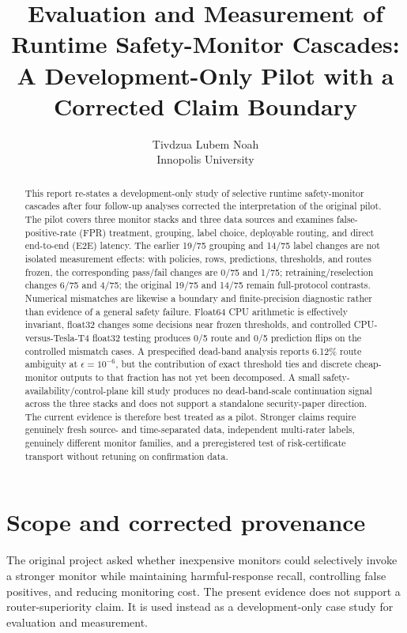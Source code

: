 \documentclass[11pt]{article}
\title{Evaluation and Measurement of Runtime Safety-Monitor Cascades:\\
A Development-Only Pilot with a Corrected Claim Boundary}
\author{Tivdzua Lubem Noah\\Innopolis University}
\date{}
\begin{document}
\maketitle

\begin{abstract}
This report re-states a development-only study of selective runtime safety-monitor cascades after four follow-up analyses corrected the interpretation of the original pilot. The pilot covers three monitor stacks and three data sources and examines false-positive-rate (FPR) treatment, grouping, label choice, deployable routing, and direct end-to-end (E2E) latency. The earlier 19/75 grouping and 14/75 label changes are not isolated measurement effects: with policies, rows, predictions, thresholds, and routes frozen, the corresponding pass/fail changes are 0/75 and 1/75; retraining/reselection changes 6/75 and 4/75; the original 19/75 and 14/75 remain full-protocol contrasts. Numerical mismatches are likewise a boundary and finite-precision diagnostic rather than evidence of a general safety failure. Float64 CPU arithmetic is effectively invariant, float32 changes some decisions near frozen thresholds, and controlled CPU-versus-Tesla-T4 float32 testing produces 0/5 route and 0/5 prediction flips on the controlled mismatch cases. A prespecified dead-band analysis reports 6.12\% route ambiguity at $\epsilon=10^{-6}$, but the contribution of exact threshold ties and discrete cheap-monitor outputs to that fraction has not yet been decomposed. A small safety-availability/control-plane kill study produces no dead-band-scale continuation signal across the three stacks and does not support a standalone security-paper direction. The current evidence is therefore best treated as a pilot. Stronger claims require genuinely fresh source- and time-separated data, independent multi-rater labels, genuinely different monitor families, and a preregistered test of risk-certificate transport without retuning on confirmation data.
\end{abstract}

\section{Scope and corrected provenance}
The original project asked whether inexpensive monitors could selectively invoke a stronger monitor while maintaining harmful-response recall, controlling false positives, and reducing monitoring cost. The present evidence does not support a router-superiority claim. It is used instead as a development-only case study for evaluation and measurement.
\end{document}
